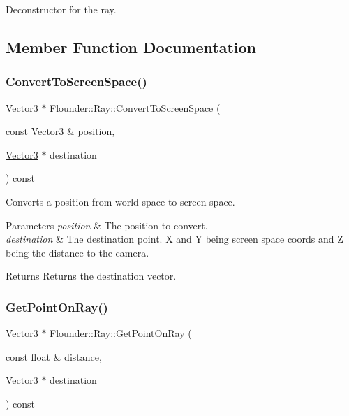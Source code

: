 Deconstructor for the ray. 



\subsection{Member Function Documentation}
\mbox{\label{class_flounder_1_1_ray_ad71167fffb1b81e150c886bf4da36285}} 
\subsubsection{\texorpdfstring{Convert\+To\+Screen\+Space()}{ConvertToScreenSpace()}}
{\footnotesize\ttfamily \hyperlink{class_flounder_1_1_vector3}{Vector3} $\ast$ Flounder\+::\+Ray\+::\+Convert\+To\+Screen\+Space (\begin{DoxyParamCaption}\item[{const \hyperlink{class_flounder_1_1_vector3}{Vector3} \&}]{position,  }\item[{\hyperlink{class_flounder_1_1_vector3}{Vector3} $\ast$}]{destination }\end{DoxyParamCaption}) const}



Converts a position from world space to screen space. 


\begin{DoxyParams}{Parameters}
{\em position} & The position to convert. \\
\hline
{\em destination} & The destination point. X and Y being screen space coords and Z being the distance to the camera. \\
\hline
\end{DoxyParams}
\begin{DoxyReturn}{Returns}
Returns the destination vector. 
\end{DoxyReturn}
\mbox{\label{class_flounder_1_1_ray_aa20b681d89218eda9f964ae78552f7b7}} 
\subsubsection{\texorpdfstring{Get\+Point\+On\+Ray()}{GetPointOnRay()}}
{\footnotesize\ttfamily \hyperlink{class_flounder_1_1_vector3}{Vector3} $\ast$ Flounder\+::\+Ray\+::\+Get\+Point\+On\+Ray (\begin{DoxyParamCaption}\item[{const float \&}]{distance,  }\item[{\hyperlink{class_flounder_1_1_vector3}{Vector3} $\ast$}]{destination }\end{DoxyParamCaption}) const}



